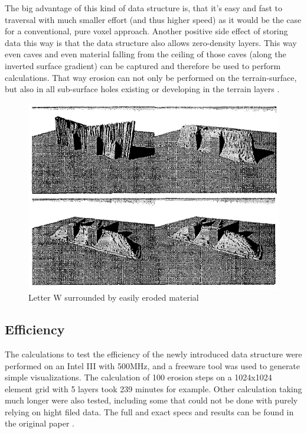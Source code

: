 The big advantage of this kind of data structure is, that it's easy and fast to traversal with much smaller effort (and thus higher speed) as it would be the case for a conventional, pure voxel approach. Another positive side effect of storing data this way is that the data structure also allows zero-density layers. This way even caves and even material falling from the ceiling of those caves (along the inverted surface gradient) can be captured and therefore be used to perform calculations. That way erosion can not only be performed on the terrain-surface, but also in all sub-surface holes existing or developing in the terrain layers \cite{marechal2010heat}.

\begin{figure}[htb]
	\centering
	\includegraphics[width=\linewidth]{MGG_10/8582.png}
	\caption{Letter W surrounded by easily eroded material}
	\label{fig:erosiondifference}
\end{figure}

\subsection{Efficiency}
The calculations to test the efficiency of the newly introduced data structure were performed on an Intel III with 500MHz, and a freeware tool was used to generate simple visualizations. The calculation of 100 erosion steps on a 1024x1024 element grid with 5 layers took 239 minutes for example. Other calculation taking much longer were also tested, including some that could not be done with purely relying on hight filed data. The full and exact specs and results can be found in the original paper \cite{marechal2010heat}.